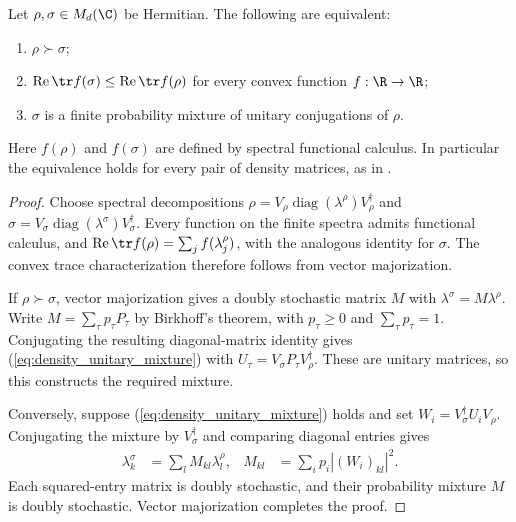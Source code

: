 \begin{theorem}
    \label{thm:density_matrix_majorization}
    \leanok
    Let $\rho,\sigma\in M_d(\C)$ be Hermitian. The following are equivalent:
    \begin{enumerate}
        \item $\rho\succ\sigma$;
        \item $\operatorname{Re}\tr f(\sigma)\leq\operatorname{Re}\tr f(\rho)$
            for every convex function $f:\R\to\R$;
        \item $\sigma$ is a finite probability mixture of unitary
            conjugations of $\rho$.
    \end{enumerate}
    Here $f(\rho)$ and $f(\sigma)$ are defined by spectral functional calculus.
    In particular the equivalence holds for every pair of density matrices,
    as in \cite[Theorem~8.7 and Equation~(8.21)]{Wolf2012Quantum}.
\end{theorem}
\begin{proof}\leanok
    Choose spectral decompositions
    $\rho=V_\rho\operatorname{diag}(\lambda^\rho)V_\rho^\dagger$ and
    $\sigma=V_\sigma\operatorname{diag}(\lambda^\sigma)V_\sigma^\dagger$.
    Every function on the finite spectra admits functional calculus, and
    $\operatorname{Re}\tr f(\rho)=\sum_j f(\lambda^\rho_j)$, with the
    analogous identity for $\sigma$. The convex trace characterization
    therefore follows from vector majorization.

    If $\rho\succ\sigma$, vector majorization gives a doubly stochastic
    matrix $M$ with $\lambda^\sigma=M\lambda^\rho$.
    Write $M=\sum_\tau p_\tau P_\tau$ by Birkhoff's theorem, with
    $p_\tau\geq0$ and $\sum_\tau p_\tau=1$.
    Conjugating the resulting diagonal-matrix identity gives
    (\ref{eq:density_unitary_mixture}) with
    $U_\tau=V_\sigma P_\tau V_\rho^\dagger$.
    These are unitary matrices, so this constructs the required mixture.

    Conversely, suppose (\ref{eq:density_unitary_mixture}) holds and set
    $W_i=V_\sigma^\dagger U_iV_\rho$.
    Conjugating the mixture by $V_\sigma^\dagger$ and comparing diagonal
    entries gives
    \begin{align}
        \lambda^\sigma_k&=\sum_l M_{kl}\lambda^\rho_l,
        &M_{kl}&=\sum_i p_i |(W_i)_{kl}|^2.
        \label{eq:density_mixture_stochastic}
    \end{align}
    Each squared-entry matrix is doubly stochastic, and their probability
    mixture $M$ is doubly stochastic. Vector majorization completes the proof.
\end{proof}

